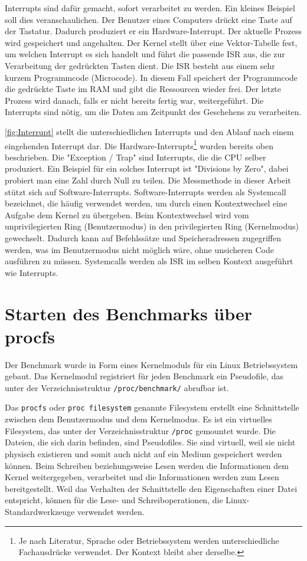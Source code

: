 Interrupts sind dafür gemacht, sofort verarbeitet zu werden. Ein kleines Beispiel soll dies veranschaulichen. Der Benutzer eines Computers drückt eine Taste auf der Tastatur. Dadurch produziert er ein Hardware-Interrupt. Der aktuelle Prozess wird gespeichert und angehalten. Der Kernel stellt über eine Vektor-Tabelle fest, um welchen Interrupt es sich handelt und führt die passende ISR aus, die zur Verarbeitung der gedrückten Tasten dient. Die ISR besteht aus einem sehr kurzem Programmcode (Microcode). In diesem Fall speichert der Programmcode die gedrückte Taste im RAM und gibt die Ressourcen wieder frei. Der letzte Prozess wird danach, falls er nicht bereits fertig war, weitergeführt. Die Interrupts sind nötig, um die Daten am Zeitpunkt des Geschehens zu verarbeiten.
\par

\autoref{fig:Interrupt} stellt die unterschiedlichen Interrupts und den Ablauf nach einem eingehenden Interrupt dar. Die Hardware-Interrupts\footnote{Je nach Literatur, Sprache oder Betriebssystem werden unterschiedliche Fachausdrücke verwendet. Der Kontext bleibt aber derselbe.} wurden bereits oben beschrieben. Die "Exception / Trap" sind Interrupts, die die CPU selber produziert. Ein Beispiel für ein solches Interrupt ist "Divisions by Zero", dabei probiert man eine Zahl durch Null zu teilen. Die Messmethode in dieser Arbeit stützt sich auf Software-Interrupts. Software-Interrupts werden als Systemcall bezeichnet, die häufig verwendet werden, um durch einen Kontextwechsel eine Aufgabe dem Kernel zu übergeben. Beim Kontextwechsel wird vom unprivilegierten Ring (Benutzermodus) in den privilegierten Ring (Kernelmodus) gewechselt. Dadurch kann auf Befehlssätze und Speicheradressen zugegriffen werden, was im Benutzermodus nicht möglich wäre, ohne unsicheren Code ausführen zu müssen. Systemcalls werden als ISR im selben Kontext ausgeführt wie Interrupts.




\section{Starten des Benchmarks über procfs}

Der Benchmark wurde in Form eines Kernelmoduls für ein Linux Betriebssystem gebaut. Das Kernelmodul registriert für jeden Benchmark ein Pseudofile, das unter der Verzeichnisstruktur \texttt{/proc/benchmark/} abrufbar ist.
\par
Das \texttt{procfs} oder \texttt{proc filesystem} genannte Filesystem erstellt eine Schnittstelle zwischen dem Benutzermodus und dem Kernelmodus. Es ist ein virtuelles Filesystem, das unter der Verzeichnisstruktur \texttt{/proc} gemountet wurde\cite{mauerer2010professional}. Die Dateien, die sich darin befinden, sind Pseudofiles. Sie sind virtuell, weil sie nicht physisch existieren und somit auch nicht auf ein Medium gespeichert werden können. Beim Schreiben beziehungsweise Lesen werden die Informationen dem Kernel weitergegeben, verarbeitet und die Informationen werden zum Lesen bereitgestellt. Weil das Verhalten der Schnittstelle den Eigenschaften einer Datei entspricht, können für die Lese- und Schreiboperationen, die Linux-Standardwerkzeuge verwendet werden.

